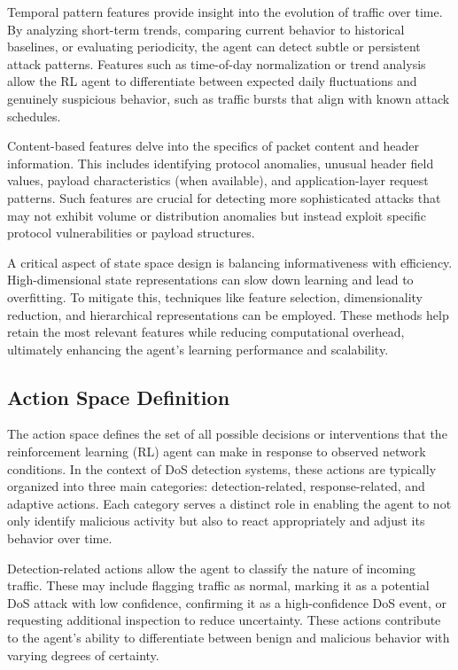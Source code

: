\documentclass{report}
\begin{document}
Temporal pattern features provide insight into the evolution of traffic over time. By analyzing short-term trends, comparing current behavior to historical baselines, or evaluating periodicity, the agent can detect subtle or persistent attack patterns. Features such as time-of-day normalization or trend analysis allow the RL agent to differentiate between expected daily fluctuations and genuinely suspicious behavior, such as traffic bursts that align with known attack schedules.

Content-based features delve into the specifics of packet content and header information. This includes identifying protocol anomalies, unusual header field values, payload characteristics (when available), and application-layer request patterns. Such features are crucial for detecting more sophisticated attacks that may not exhibit volume or distribution anomalies but instead exploit specific protocol vulnerabilities or payload structures.

A critical aspect of state space design is balancing informativeness with efficiency. High-dimensional state representations can slow down learning and lead to overfitting. To mitigate this, techniques like feature selection, dimensionality reduction, and hierarchical representations can be employed. These methods help retain the most relevant features while reducing computational overhead, ultimately enhancing the agent’s learning performance and scalability.

\subsection{Action Space Definition}

The action space defines the set of all possible decisions or interventions that the reinforcement learning (RL) agent can make in response to observed network conditions. In the context of DoS detection systems, these actions are typically organized into three main categories: detection-related, response-related, and adaptive actions. Each category serves a distinct role in enabling the agent to not only identify malicious activity but also to react appropriately and adjust its behavior over time.

Detection-related actions allow the agent to classify the nature of incoming traffic. These may include flagging traffic as normal, marking it as a potential DoS attack with low confidence, confirming it as a high-confidence DoS event, or requesting additional inspection to reduce uncertainty. These actions contribute to the agent’s ability to differentiate between benign and malicious behavior with varying degrees of certainty.
\end{document}
